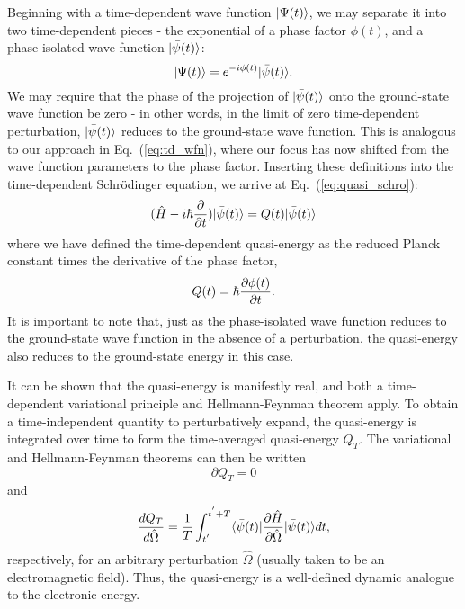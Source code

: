 {{Beginning with a time-dependent wave function $| \Psi(t) \rangle$, we may separate it into two time-dependent pieces - the exponential of a phase factor $\phi(t)$, and a phase-isolated wave function $| \bar\psi(t) \rangle$:
\begin{equation} \label{total_psi}
    | \Psi(t) \rangle = e^{-i\phi(t)}| \bar\psi(t) \rangle.
\end{equation}
We may require that the phase of the projection of $| \bar\psi(t) \rangle$ onto the ground-state wave function be 
zero - in other words, in the limit of zero time-dependent perturbation, $| \bar\psi(t) \rangle$ reduces to the
ground-state wave function. This is analogous to our approach in Eq.~(\ref{eq:td_wfn}), where our focus has
now shifted from the wave function parameters to the phase factor.
Inserting these definitions into the time-dependent Schr\"odinger equation,
we arrive at Eq.~(\ref{eq:quasi_schro}):
\begin{equation} \label{eq:quasi_schro}
    (\hat{H} - i\hbar \frac{\partial}{\partial t})| \bar\psi(t) \rangle = Q(t)| \bar\psi(t) \rangle
\end{equation}
where we have defined the time-dependent quasi-energy as the reduced Planck constant times the derivative
of the phase factor,
\begin{equation} \label{eq:quasi_e}
    Q(t) = \hbar\frac{\partial\phi(t)}{\partial t}.
\end{equation}
It is important to note that, just as the phase-isolated wave function reduces to the ground-state wave function in the absence of a perturbation, the quasi-energy also reduces to the ground-state energy in this case. 

It can be shown that the quasi-energy is manifestly real, and both a time-dependent variational 
principle and Hellmann-Feynman theorem apply.\cite{Norman2011} To obtain a time-independent 
quantity to perturbatively expand, the quasi-energy is integrated over time to form the 
time-averaged quasi-energy $Q_T$. The variational and Hellmann-Feynman theorems can then be written
\begin{equation} \label{eq:var}
    \partial Q_T = 0
\end{equation}
and
\begin{equation} \label{eq:hf-theorem}
    \frac{dQ_T}{d\hat\Omega} = \frac{1}{T}\int_{t^{'}}^{t^{'}+T}\langle\bar\psi(t) |\frac{\partial \hat{H}}{\partial\hat\Omega}| \bar\psi(t) \rangle dt,
\end{equation}
respectively, for an arbitrary perturbation $\hat\Omega$ (usually taken to be an 
electromagnetic field). Thus, the quasi-energy is a well-defined dynamic analogue to the
electronic energy. 

}}

